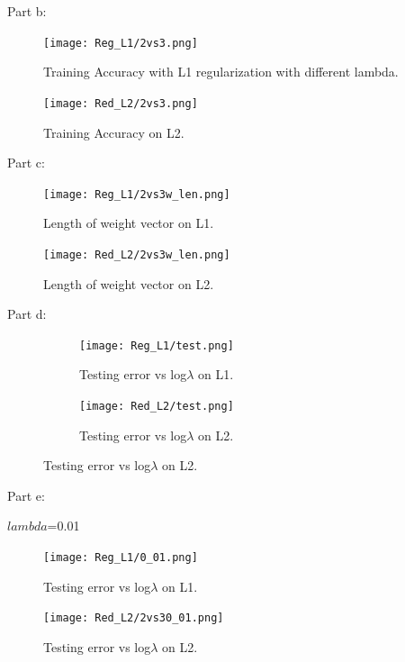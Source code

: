 \documentclass{article} %
\begin{document}
Part b:
\begin{figure}[h]
\begin{center}
\texttt{[image: Reg\_L1/2vs3.png]}
\end{center}
\caption{Training Accuracy with L1 regularization with different lambda.}
\end{figure}

\begin{figure}[h]
\begin{center}
\texttt{[image: Red\_L2/2vs3.png]}
\end{center}
\caption{Training Accuracy on L2.}
\end{figure}

Part c:
\begin{figure}[h]
\begin{center}
\texttt{[image: Reg\_L1/2vs3w\_len.png]}
\end{center}
\caption{Length of weight vector on L1.}
\end{figure}

\begin{figure}[h]
\begin{center}
\texttt{[image: Red\_L2/2vs3w\_len.png]}
\end{center}
\caption{Length of weight vector on L2.}
\end{figure}

Part d:

\begin{figure}
\centering
\begin{subfigure}{.6\textwidth}
	\centering
	\texttt{[image: Reg\_L1/test.png]}
	\caption{Testing error vs log$\lambda$ on L1.}
\end{subfigure}%
\begin{subfigure}{.6\textwidth}
    \centering
	\texttt{[image: Red\_L2/test.png]}
	\caption{Testing error vs log$\lambda$ on L2.}
\end{subfigure}
\end{figure}

Part e:

$lambda$=0.01

\begin{figure}[h]
\begin{center}
\texttt{[image: Reg\_L1/0\_01.png]}
\end{center}
\caption{Testing error vs log$\lambda$ on L1.}
\end{figure}

\begin{figure}[h]
\begin{center}
\texttt{[image: Red\_L2/2vs30\_01.png]}
\end{center}
\caption{Testing error vs log$\lambda$ on L2.}
\end{figure}
\end{document}
